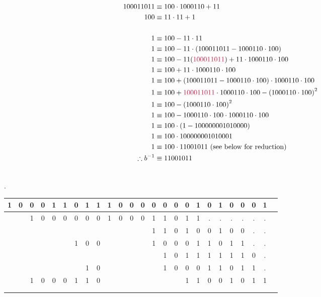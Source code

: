 \begin{problem}
\begin{enumerate}
\begin{Answer}
\begin{align*}
100011011  &\equiv 100 \cdot 1000110 + 11\\
100 &\equiv 11 \cdot 11 + 1\\
\bigskip\\
1 &\equiv 100 - 11 \cdot 11\\
1 &\equiv 100 - 11 \cdot (100011011-1000110 \cdot 100)\\
1 &\equiv 100 - 11(\crim{100011011}) + 11 \cdot 1000110 \cdot 100\\
1 &\equiv 100 + 11 \cdot 1000110 \cdot 100\\
1 &\equiv 100 + (100011011-1000110 \cdot 100) \cdot 1000110 \cdot 100\\
1 &\equiv 100 + \crim{100011011} \cdot 1000110 \cdot 100 - {(1000110 \cdot 100)}^{2}\\
1 &\equiv 100 - {(1000110 \cdot 100)}^{2}\\
1 &\equiv 100 - 1000110 \cdot 100 \cdot 1000110 \cdot 100\\
1 &\equiv 100 \cdot (1 - 100000001010000)\\
1 &\equiv 100 \cdot 100000001010001\\
1 &\equiv 100 \cdot 11001011 \text{ (see below for reduction)}\\
\therefore b^{-1} &\equiv 11001011\\
\
\end{align*}

\bigskip
\noindent
{}.

\bigskip
\color{zaffre}
\begin{tabular}{c@{\,}c@{\,}c@{\,}c@{\,}c@{\,}c@{\,}c@{\,}c@{\,}c@{\,} | c@{\,}c@{\,}c@{\,}c@{\,}c@{\,}c@{\,}c@{\,}c@{\,}c@{\,}c@{\,}c@{\,}c@{\,}c@{\,}c@{\,}c@{\,}c@{\,}}
  1 & 0 & 0 & 0 & 1 & 1 & 0 & 1 & 1     & 1 & 0 & 0 & 0 & 0 & 0 & 0 & 0 & 1 & 0 & 1 & 0 & 0 & 0 &1\\
\hline{}
    &   & 1 & 0 & 0 & 0 & 0 & 0 & 0     & 1 & 0 & 0 & 0 & 1 & 1 & 0 & 1 & 1 &.  &.  &.  &.  &.  &.\\
    &   &   &   &   &   &   &   &       &   &   &   &   & 1 & 1 & 0 & 1 & 0 & 0 & 1 & 0 & 0 &.  &.\\
    &   &   &   &   &   & 1 & 0 & 0     &   &   &   &   & 1 & 0 & 0 & 0 & 1 & 1 & 0 & 1 & 1 &.  &.\\
    &   &   &   &   &   &   &   &       &   &   &   &   &   & 1 & 0 & 1 & 1 & 1 & 1 & 1 & 1 & 0 &.\\
    &   &   &   &   &   &   & 1 & 0     &   &   &   &   &   & 1 & 0 & 0 & 0 & 1 & 1 & 0 & 1 & 1 &.\\
\hline{}
    &   & 1 & 0 & 0 & 0 & 1 & 1 & 0     &   &   &   &   &   &   &   & 1 & 1 & 0 & 0 & 1 & 0 & 1 &1\\
\\
\\
\end{tabular}
\color{black}


\end{Answer}
\end{enumerate}
\end{problem}
